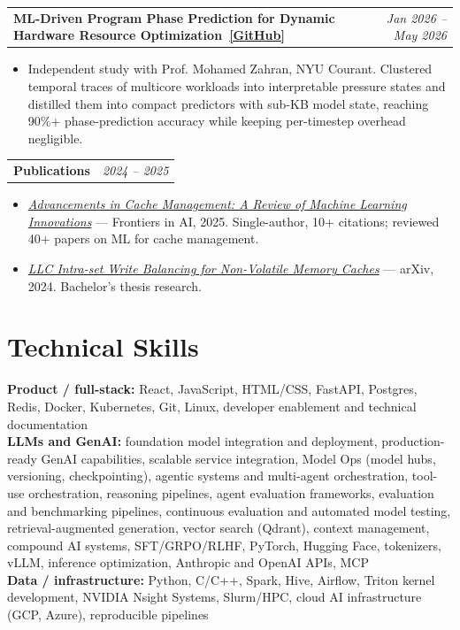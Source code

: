 \documentclass[10pt,letterpaper]{article}
\makeatletter
\newcommand{\est}[1]{\textcolor{red!70!black}{#1}}
\newcommand{\project}[2]{%
  \begin{tabularx}{\textwidth}{@{}Xr@{}}
    \textbf{#1} & \textit{#2}
  \end{tabularx}\vspace{-0.25em}
}
\makeatother
\begin{document}
\vspace{0.75em}
\project{ML-Driven Program Phase Prediction for Dynamic Hardware Resource Optimization~\href{https://github.com/k-keshav-k/ML-based-hardware-optimization-using-Phases}{[GitHub]}}{Jan 2026 -- May 2026}
\begin{itemize}
  \item Independent study with Prof. Mohamed Zahran, NYU Courant. Clustered temporal traces of multicore workloads into interpretable pressure states and distilled them into compact predictors with sub-KB model state, reaching \est{90\%+} phase-prediction accuracy while keeping per-timestep overhead negligible.
\end{itemize}

\vspace{0.75em}
\project{Publications}{2024 -- 2025}
\begin{itemize}
  \item \href{https://www.frontiersin.org/journals/artificial-intelligence/articles/10.3389/frai.2025.1441250/full}{\textit{Advancements in Cache Management: A Review of Machine Learning Innovations}} --- Frontiers in AI, 2025. Single-author, 10+ citations; reviewed 40+ papers on ML for cache management.
  \item \href{https://arxiv.org/abs/2410.15344}{\textit{LLC Intra-set Write Balancing for Non-Volatile Memory Caches}} --- arXiv, 2024. Bachelor's thesis research.
\end{itemize}

\section{Technical Skills}

\textbf{Product / full-stack:} React, JavaScript, HTML/CSS, FastAPI, Postgres, Redis, Docker, Kubernetes, Git, Linux, developer enablement and technical documentation\\
\textbf{LLMs and GenAI:} foundation model integration and deployment, production-ready GenAI capabilities, scalable service integration, Model Ops (model hubs, versioning, checkpointing), agentic systems and multi-agent orchestration, tool-use orchestration, reasoning pipelines, agent evaluation frameworks, evaluation and benchmarking pipelines, continuous evaluation and automated model testing, retrieval-augmented generation, vector search (Qdrant), context management, compound AI systems, SFT/GRPO/RLHF, PyTorch, Hugging Face, tokenizers, vLLM, inference optimization, Anthropic and OpenAI APIs, MCP\\
\textbf{Data / infrastructure:} Python, C/C++, Spark, Hive, Airflow, Triton kernel development, NVIDIA Nsight Systems, Slurm/HPC, cloud AI infrastructure (GCP, Azure), reproducible pipelines
\end{document}

